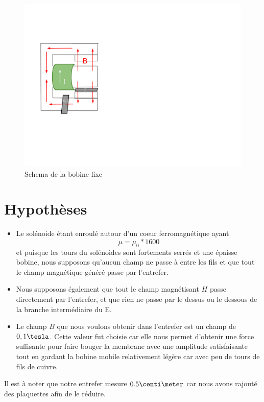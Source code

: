 \begin{figure}	
\begin{center}
\includegraphics[scale=0.5]{img/schema-aimant-bobine}
\end{center}
\caption{Schema de la bobine fixe}		
\label{fig:bobinefixe}		
\end{figure}

\section{Hypothèses}
\begin{itemize}
\item Le solénoide étant enroulé autour d'un coeur ferromagnétique ayant \[\mu = \mu_0 * 1600\] et puisque les 
tours du solénoides sont fortements serrés et une épaisse bobine, nous supposons qu'aucun champ ne passe 
à entre les fils et que tout le champ magnétique généré passe par l'entrefer.
\item Nous supposons également que tout le champ magnétisant $H$ passe directement par l'entrefer, et que rien ne passe par 
le dessus ou le dessous de la branche intermédiaire du E.
\item Le champ $B$ que nous voulons obtenir dans l'entrefer est un champ de $0,1\tesla$. Cette valeur fut choisie car elle nous permet d'obtenir une force suffisante pour faire bouger la membrane avec une amplitude satisfaisante tout en gardant la bobine 
mobile relativement légère car avec peu de tours de fils de cuivre.
\end{itemize}
Il est à noter que notre entrefer mesure $0.5\centi\meter$ car nous avons rajouté des plaquettes afin de le réduire.
